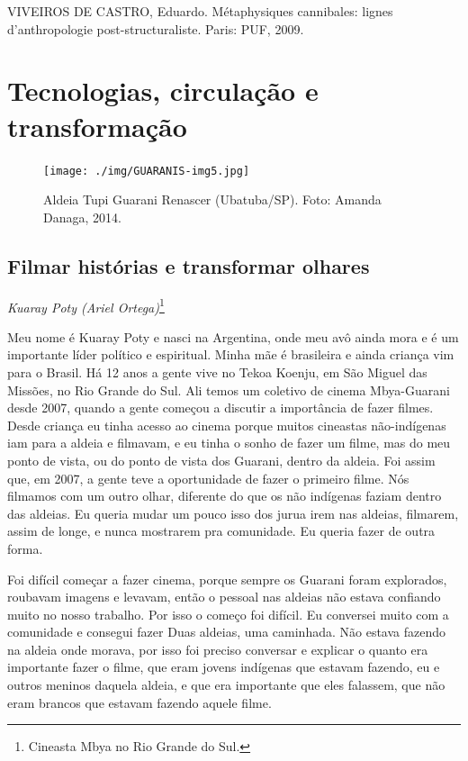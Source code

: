 VIVEIROS DE CASTRO, Eduardo. Métaphysiques cannibales: lignes
d’anthropologie post-structuraliste. Paris: PUF, 2009.


\part{Tecnologias, circulação e transformação}

\begin{figure}
  \centering
 \texttt{[image: ./img/GUARANIS-img5.jpg]}	
  \hfill
  \caption{Aldeia Tupi Guarani Renascer (Ubatuba/SP). Foto: Amanda Danaga, 2014.}
\end{figure}

 


\chapter{Filmar histórias e transformar olhares}
\begin{flushright}
\emph{Kuaray Poty (Ariel Ortega)}\footnote{Cineasta Mbya no Rio Grande do
Sul.}
\end{flushright}
\medskip

Meu nome é Kuaray Poty e nasci na Argentina, onde meu avô ainda mora e é
um importante líder político e espiritual. Minha mãe é brasileira e
ainda criança vim para o Brasil. Há 12 anos a gente vive no Tekoa
Koenju, em São Miguel das Missões, no Rio Grande do Sul. Ali temos um
coletivo de cinema Mbya-Guarani desde 2007, quando a gente começou a
discutir a importância de fazer filmes. Desde criança eu tinha acesso
ao cinema porque muitos cineastas não-indígenas iam para a aldeia e
filmavam, e eu tinha o sonho de fazer um filme, mas do meu ponto de
vista, ou do ponto de vista dos Guarani, dentro da aldeia. Foi assim
que, em 2007, a gente teve a oportunidade de fazer o primeiro filme.
Nós filmamos com um outro olhar, diferente do que os não indígenas
faziam dentro das aldeias. Eu queria mudar um pouco isso dos jurua irem
nas aldeias, filmarem, assim de longe, e nunca mostrarem pra
comunidade. Eu queria fazer de outra forma. 

Foi difícil começar a fazer cinema, porque sempre os Guarani foram
explorados, roubavam imagens e levavam, então o pessoal nas aldeias não
estava confiando muito no nosso trabalho. Por isso o começo foi
difícil. Eu conversei muito com a comunidade e consegui fazer Duas
aldeias, uma caminhada. Não estava fazendo na aldeia onde morava, por
isso foi preciso conversar e explicar o quanto era importante fazer o
filme, que eram jovens indígenas que estavam fazendo, eu e outros
meninos daquela aldeia, e que era importante que eles falassem, que não
eram brancos que estavam fazendo aquele filme. 

